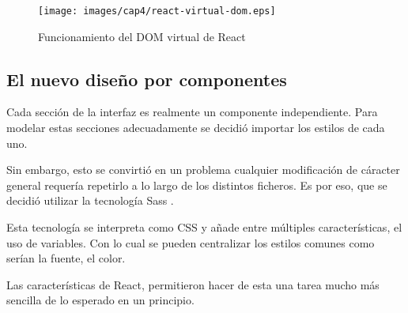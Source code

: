 \begin{figure}[!th]
\begin{center}
\texttt{[image: images/cap4/react-virtual-dom.eps]}
\caption{Funcionamiento del DOM virtual de React \cite{ReactVirtualDOM}}
\label{fig:Funcionamiento del DOM virtual de React}
\end{center}
\end{figure}

\subsection{El nuevo diseño por componentes}

Cada sección de la interfaz es realmente un componente independiente. Para modelar estas secciones 
adecuadamente se decidió importar los estilos de cada uno.

\bigskip
Sin embargo, esto se convirtió en un problema cualquier modificación de cáracter general requería
repetirlo a lo largo de los distintos ficheros. Es por eso, que se decidió utilizar la tecnología
Sass \cite{Sass}.

\bigskip
Esta tecnología se interpreta como CSS y añade entre múltiples características, el uso de variables. 
Con lo cual se pueden centralizar los estilos comunes como serían la fuente, el color.

\bigskip
Las características de React, permitieron hacer de esta una tarea mucho más sencilla de lo esperado en 
un principio.